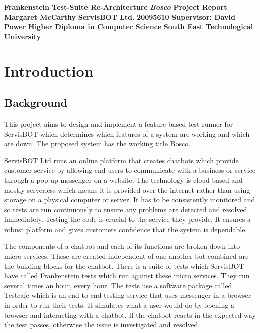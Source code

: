 \documentclass[12pt,a4paper,titlepage]{report}
\newcommand\AcademicTitle{Frankenstein Test-Suite Re-Architecture}
\newcommand\CommericalTitle{Bosco}
\newcommand\Author{Margaret McCarthy}
\newcommand\StudentID{20095610}
\newcommand\Report{Project Report}
\newcommand\Stakeholder{ServisBOT Ltd.}
\newcommand\Course{Higher Diploma in Computer Science}
\newcommand\Reader{Supervisor: David Power}
\newcommand\University{South East Technological University}
\begin{document}

\thispagestyle{empty}
\begin{center}
  \mbox{}\vfill
  {\fontsize{18pt}{20pt}\selectfont \bfseries \AcademicTitle}
  \vfill
  {\fontsize{14pt}{20pt}\selectfont \bfseries\itshape \CommericalTitle}
  \vfill
  {\fontsize{12pt}{20pt}\selectfont \bfseries \Report}
  \vfill
  {\fontsize{14pt}{20pt}\selectfont \bfseries \Author}
  \vfill
  {\fontsize{14pt}{20pt}\selectfont \bfseries \Stakeholder}
  \vfill
  {\fontsize{14pt}{20pt}\selectfont \bfseries \StudentID}
  \vfill
  {\fontsize{14pt}{20pt}\selectfont \bfseries \Reader}
  \vfill
  {\fontsize{14pt}{20pt}\selectfont \bfseries \Course}
  \vfill
  {\fontsize{14pt}{20pt}\selectfont \bfseries \University}
  \vfill
\end{center}
\clearpage

\tableofcontents

\listoftables

\listoffigures

\clearpage
{}
\setcounter{page}{1}

\chapter{Introduction}

\section{Background}

This project aims to design and implement a feature based test runner for ServisBOT which determines which features of a system are working and which are down. The proposed system has the working title Bosco.

ServisBOT Ltd runs an online platform that creates chatbots which provide customer service by allowing end users to communicate with a business or service through a pop up messenger on a website. The technology is cloud based and mostly serverless which means it is provided over the internet rather than using storage on a physical computer or server. It has to be consistently monitored and so tests are run continuously to ensure any problems are detected and resolved immediately. Testing the code is crucial to the service they provide. It ensures a robust platform and gives customers confidence that the system is dependable.

The components of a chatbot and each of its functions are broken down into micro services. These are created independent of one another but combined are the building blocks for the chatbot. There is a suite of tests which ServisBOT have called Frankenstein tests which run against these micro services. They run several times an hour, every hour. The tests use a software package called Testcafe which is an end to end testing service that uses messenger in a browser in order to run their tests. It simulates what a user would do by opening a browser and interacting with a chatbot. If the chatbot reacts in the expected way the test passes, otherwise the issue is investigated and resolved.
\end{document}
